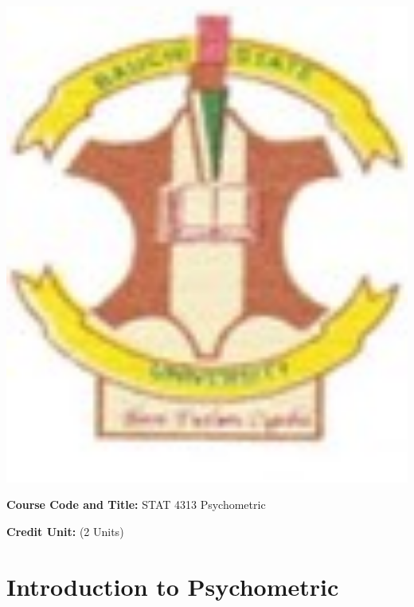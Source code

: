 \documentclass[12pt, a4paper]{exam}
\begin{document}
\begin{minipage}[l]{0.1\textwidth}		
		\noindent
		\includegraphics[width=1.4\textwidth]{gadau}
	\end{minipage}

\par
\vspace{0.2in}
\noindent
\begin{flushleft}
\textbf{Course Code and Title:} STAT 4313 Psychometric \par
\textbf{Credit Unit:} (2 Units)  			


\par\noindent\hrulefill


\end{flushleft}
\vspace{0.15in}
\noindent


\section{Introduction to Psychometric}
\end{document}
